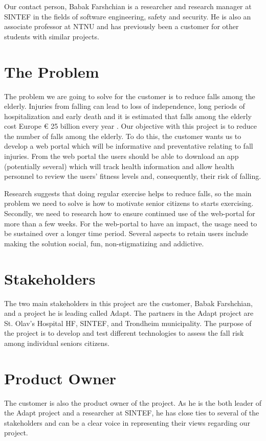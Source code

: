 Our contact person, Babak Farshchian is a researcher and research manager at SINTEF in the fields of software engineering, safety and security.  He is also an associate professor at NTNU and has previously been a customer for other students with similar projects.

\section{The Problem}

The problem we are going to solve for the customer is to reduce falls among the elderly. Injuries from falling can lead to loss of independence, long periods of hospitalization and early death and it is estimated that falls among the elderly cost Europe \euro{} 25 billion every year \cite{eupha}.  Our objective with this project is to reduce the number of falls among the elderly. To do this, the customer wants us to develop a web portal which will be informative and preventative relating to fall injuries. From the web portal the users should be able to download an app (potentially several) which will track health information and allow health personnel to review the users’ fitness levels and, consequently, their risk of falling.

Research suggests that doing regular exercise helps to reduce falls, so the main problem we need to solve is how to motivate senior citizens to starts exercising. Secondly, we need to research how to ensure continued use of the web-portal for more than a few weeks. For the web-portal to have an impact, the usage need to be sustained over a longer time period. Several aspects to retain users include making the solution social, fun, non-stigmatizing and addictive. 
\section{Stakeholders}
The two main stakeholders in this project are the customer, Babak Farshchian, and a project he is leading called Adapt. The partners in the Adapt project are St. Olav's Hospital HF, SINTEF, and Trondheim municipality. The purpose of the project is to develop and test different technologies to assess the fall risk among individual seniors citizens.\citep{adapt}

\section{Product Owner}
The customer is also the product owner of the project. As he is the both leader of the Adapt project and a researcher at SINTEF, he has close ties to several of the stakeholders and can be a clear voice in representing their views regarding our project.

